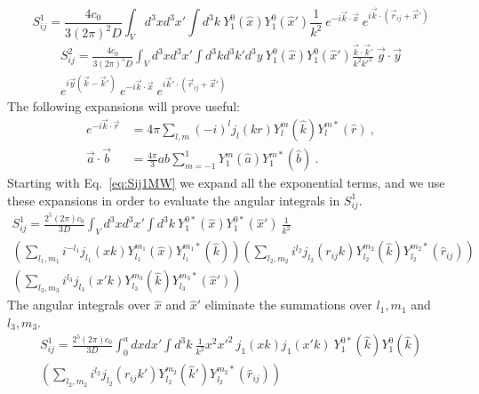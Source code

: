 \begin{equation} \label{eq:Sij1MW}
    S_{ij}^1 = \frac{4c_0}{3(2\pi)^2D} \int_V d^3x d^3x' \int d^3k \ Y_1^0(\hat{x})Y_1^0(\hat{x}') \frac{1}{k^2} \ e^{-i\vec{k}\cdot\vec{x}} \
    e^{i\vec{k}\cdot(\vec{r}_{ij}+\vec{x}')}
\end{equation}
\begin{equation} \label{eq:Sij2MW}
\begin{split}
    S_{ij}^2 = \frac{4c_0}{3(2\pi)^5D} \int_V d^3x d^3x' \int d^3kd^3k'd^3y \ Y_1^0(\hat{x})Y_1^0(\hat{x}') \frac{\vec{k}\cdot\vec{k}'}{k^2k'^2} \ \vec{g}\cdot\vec{y} \\
    e^{i\vec{y}(\vec{k}-\vec{k}')} \
    e^{-i\vec{k}\cdot\vec{x}} \
    e^{i\vec{k}'\cdot(\vec{r}_{ij}+\vec{x}')}
\end{split}
\end{equation}
The following expansions will prove useful:
\begin{align}
    e^{-i\vec{k}\cdot\vec{r}} &= 4\pi \sum_{l,m} (-i)^l j_l(kr) Y_l^{m}(\hat{k}) Y_l^{m*}(\hat{r}) \ , \label{eq:planewave} \\
    \vec{a}\cdot\vec{b} &= \frac{4\pi}{3} ab \sum_{m=-1}^1 Y_1^m(\hat{a}) Y_1^{m*}(\hat{b}) \ . \label{eq:dotprod}
\end{align}
Starting with Eq.\ \ref{eq:Sij1MW} we expand all the exponential terms, and we use these expansions in order to evaluate the angular integrals in $S_{ij}^1$.
\begin{equation}
\begin{split}
    S_{ij}^1 = \frac{2^5(2\pi)c_0}{3D} \int_V d^3x d^3x' \int d^3k \ Y_1^{0*}(\hat{x})Y_1^{0*}(\hat{x}') \ \frac{1}{k^2} \\
    \left(\sum_{l_1,m_1}i^{-l_1} j_{l_1}(xk) Y_{l_1}^{m_1}(\hat{x}) Y_{l_1}^{m_1*}(\hat{k}) \right)
    \left(\sum_{l_2,m_2}i^{l_2} j_{l_2}(r_{ij}k) Y_{l_2}^{m_2}(\hat{k}) Y_{l_2}^{m_2*}(\hat{r}_{ij}) \right) \\
    \left(\sum_{l_3,m_3}i^{l_3} j_{l_3}(x'k) Y_{l_3}^{m_3}(\hat{k}) Y_{l_3}^{m_3*}(\hat{x}') \right)
\end{split}
\end{equation}
The angular integrals over $\hat{x}$ and $\hat{x}'$ eliminate the summations over $l_1,m_1$ and $l_3,m_3$.
\begin{equation} \label{eq:Sij3MW}
\begin{split}
    S_{ij}^1 = \frac{2^5(2\pi)c_0}{3D} \int_0^a dx dx' \int d^3k \ \frac{1}{k^2} x^2 x'^2 \ j_{1}(xk) j_{1}(x'k) \ Y_{1}^{0*}(\hat{k}) Y_{1}^{0}(\hat{k}) \\
    \left(\sum_{l_2,m_2}i^{l_2} j_{l_2}(r_{ij}k') Y_{l_2}^{m_2}(\hat{k}') Y_{l_2}^{m_2*}(\hat{r}_{ij}) \right)
\end{split}
\end{equation}

